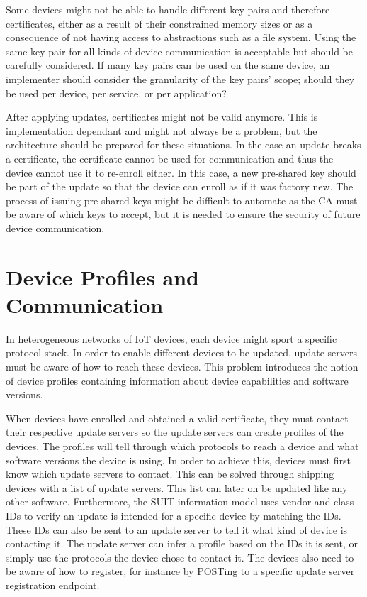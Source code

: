 \documentclass[0-thesis.tex]{subfiles}
\begin{document}
Some devices might not be able to handle different key pairs and therefore certificates,
either as a result of their constrained memory sizes or as a consequence of not having
access to abstractions such as a file system. Using the same key pair for all kinds of
device communication is acceptable but should be carefully considered. If many key pairs
can be used on the same device, an implementer should consider the granularity of the key
pairs' scope; should they be used per device, per service, or per application?

After applying updates, certificates might not be valid anymore. This is implementation
dependant and might not always be a problem, but the architecture should be prepared for
these situations. In the case an update breaks a certificate, the certificate cannot be
used for communication and thus the device cannot use it to re-enroll either. In this
case, a new pre-shared key should be part of the update so that the device can enroll as
if it was factory new. The process of issuing pre-shared keys might be difficult to
automate as the CA must be aware of which keys to accept, but it is needed to ensure the
security of future device communication.

\section{Device Profiles and Communication}
\label{sec:communication}
In heterogeneous networks of IoT devices, each device might sport a specific protocol
stack. In order to enable different devices to be updated, update servers must be aware of
how to reach these devices. This problem introduces the notion of device profiles
containing information about device capabilities and software versions. 

When devices have enrolled and obtained a valid certificate, they must contact their
respective update servers so the update servers can create profiles of the devices. The
profiles will tell through which protocols to reach a device and what software versions
the device is using. In order to achieve this, devices must first know which update
servers to contact. This can be solved through shipping devices with a list of update
servers. This list can later on be updated like any other software. Furthermore, the SUIT
information model uses vendor and class IDs to verify an update is intended for a specific
device by matching the IDs. These IDs can also be sent to an update server to tell it what
kind of device is contacting it. The update server can infer a profile based on the IDs it
is sent, or simply use the protocols the device chose to contact it. The devices also need
to be aware of how to register, for instance by POSTing to a specific update server
registration endpoint. 
\end{document}
